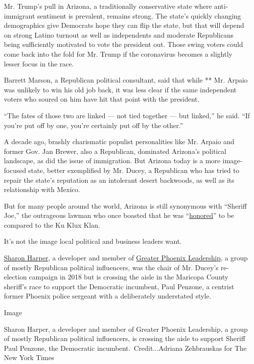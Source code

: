 Mr. Trump's pull in Arizona, a traditionally conservative state where
anti-immigrant sentiment is prevalent, remains strong. The state's
quickly changing demographics give Democrats hope they can flip the
state, but that will depend on strong Latino turnout as well as
independents and moderate Republicans being sufficiently motivated to
vote the president out. Those swing voters could come back into the fold
for Mr. Trump if the coronavirus becomes a slightly lesser focus in the
race.

Barrett Marson, a Republican political consultant, said that while **
Mr. Arpaio was unlikely to win his old job back, it was less clear if
the same independent voters who soured on him have hit that point with
the president.

``The fates of those two are linked --- not tied together --- but
linked,'' he said. ``If you're put off by one, you're certainly put off
by the other.''

A decade ago, brashly charismatic populist personalities like Mr. Arpaio
and former Gov. Jan Brewer, also a Republican, dominated Arizona's
political landscape, as did the issue of immigration. But Arizona today
is a more image-focused state, better exemplified by Mr. Ducey, a
Republican who has tried to repair the state's reputation as an
intolerant desert backwoods, as well as its relationship with Mexico.

But for many people around the world, Arizona is still synonymous with
``Sheriff Joe,'' the outrageous lawman who once boasted that he was
``\href{https://www.newsweek.com/arpaio-trump-kkk-pardon-657134}{honored}''
to be compared to the Ku Klux Klan.

It's not the image local political and business leaders want.

\href{https://www.theplazaco.com/wp-content/uploads/2018/08/Sharon-Harper-Bio.pdf}{Sharon
Harper}, a developer and member of
\href{https://www.gplinc.org/leadership/}{Greater Phoenix Leadership}, a
group of mostly Republican political influencers, was the chair of Mr.
Ducey's re-election campaign in 2018 but is crossing the aisle in the
Maricopa County sheriff's race to support the Democratic incumbent, Paul
Penzone, a centrist former Phoenix police sergeant with a deliberately
understated style.

Image

Sharon Harper, a developer and member of Greater Phoenix Leadership, a
group of mostly Republican political influencers, is crossing the aisle
to support Sheriff Paul Penzone, the Democratic
incumbent.~Credit...Adriana Zehbrauskas for The New York Times

